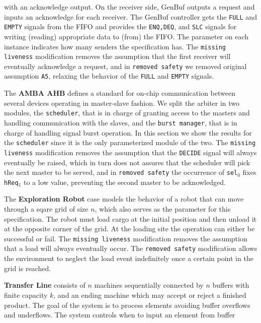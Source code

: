 \begin{description}[align=left,leftmargin=0.7cm,font=\normalfont,style=nextline,itemsep=0pt]
with an acknowledge output. On the receiver side, GenBuf outputs a request and inputs an
acknowledge for each receiver. The GenBuf controller gets the \texttt{FULL} and \texttt{EMPTY} signals from the FIFO and
provides the \texttt{ENQ,DEQ}, and \texttt{SLC} signals for writing (reading) appropriate data to (from) the FIFO.
The parameter on each instance indicates how many senders the specification has. The \texttt{missing liveness} modification removes the assumption that the first receiver will eventually acknowledge a request, and in \texttt{removed safety} we removed original assumption \texttt{A5}, relaxing the behavior of the \texttt{FULL} and \texttt{EMPTY} signals.
\item[AB] The \textbf{AMBA AHB} defines a standard for on-chip communication between several devices operating in master-slave fashion. We split the arbiter in two modules, the \texttt{scheduler}, that is in charge of granting access to the masters and handling communication with the slaves, and the \texttt{burst manager}, that is in charge of handling signal burst operation. In this section we show the results for the \texttt{scheduler} since it is the only parameterized module of the two. 
The \texttt{missing liveness} modification removes the assumption that the \texttt{DECIDE} signal will always eventually be raised, which in turn does not assures that the scheduler will pick the next master to be served, and in \texttt{removed safety} the occurrence of \texttt{sel$_0$} fixes \texttt{hReq$_1$} to a low value, preventing the second master to be acknowledged. 
\item[ER] The \textbf{Exploration Robot} case models the behavior of a robot that can move through a sqare grid of size $n$, which also serves as the parameter for this specification. The robot must load cargo at the initial position and then unload it at the opposite corner of the grid. At the loading site the operation can either be successful or fail. The \texttt{missing liveness} modification removes the assumption that a load will always eventually occur. The \texttt{removed safety} modification allows the environment to neglect the load event indefinitely once a certain point in the grid is reached.
\item[TL] \textbf{Transfer Line} consists of $n$ machines
sequentially connected by $n$ buffers with finite capacity $k$, and an ending machine which may accept or reject a
finished product. The goal of the system is to process
elements avoiding buffer overflows and underflows. The
system controls when to input an element from buffer

\end{description}
